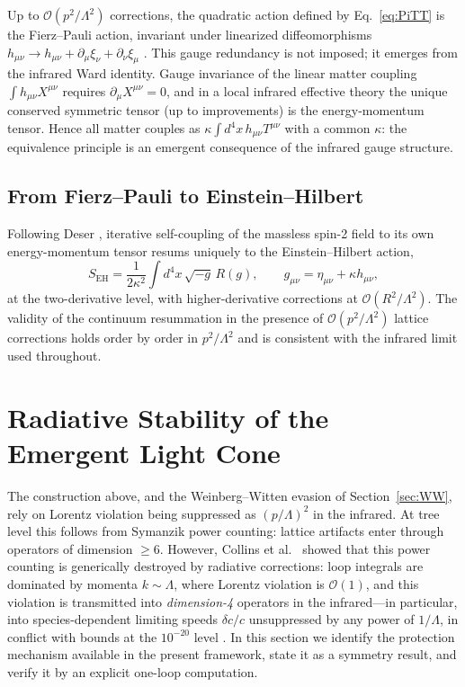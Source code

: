 \documentclass[11pt,a4paper]{article}
\begin{document}
Up to $\mathcal{O}(p^2/\Lambda^2)$ corrections, the quadratic
action defined by Eq.~\eqref{eq:PiTT} is the Fierz--Pauli action,
invariant under linearized diffeomorphisms
$h_{\mu\nu} \to h_{\mu\nu} + \partial_\mu\xi_\nu
+ \partial_\nu\xi_\mu$ \cite{Fierz:1939ix}.
This gauge redundancy is not imposed; it emerges from the infrared
Ward identity.
Gauge invariance of the linear matter coupling
$\int h_{\mu\nu}X^{\mu\nu}$ requires
$\partial_\mu X^{\mu\nu} = 0$, and in a local infrared effective
theory the unique conserved symmetric tensor (up to improvements)
is the energy-momentum tensor.
Hence all matter couples as
$\kappa\int d^4x\,h_{\mu\nu}T^{\mu\nu}$ with a common $\kappa$:
the equivalence principle is an emergent consequence of the
infrared gauge structure.

\subsection{From Fierz--Pauli to Einstein--Hilbert}

Following Deser \cite{Deser:1969wk}, iterative self-coupling of the
massless spin-2 field to its own energy-momentum tensor resums
uniquely to the Einstein--Hilbert action,
\begin{equation}
S_{\mathrm{EH}} = \frac{1}{2\kappa^2}\int d^4x\,
\sqrt{-g}\,R(g),
\qquad
g_{\mu\nu} = \eta_{\mu\nu} + \kappa h_{\mu\nu},
\label{eq:EH}
\end{equation}
at the two-derivative level, with higher-derivative corrections at
$\mathcal{O}(R^2/\Lambda^2)$.
The validity of the continuum resummation in the presence of
$\mathcal{O}(p^2/\Lambda^2)$ lattice corrections holds order by
order in $p^2/\Lambda^2$ and is consistent with the infrared limit
used throughout.


\section{Radiative Stability of the Emergent Light Cone}
\label{sec:lightcone}

The construction above, and the Weinberg--Witten evasion of
Section~\ref{sec:WW}, rely on Lorentz violation being suppressed as
$(p/\Lambda)^2$ in the infrared.
At tree level this follows from Symanzik power counting: lattice
artifacts enter through operators of dimension $\geq 6$.
However, Collins et al.\ \cite{Collins:2004bp} showed that this
power counting is generically destroyed by radiative corrections:
loop integrals are dominated by momenta $k \sim \Lambda$, where
Lorentz violation is $\mathcal{O}(1)$, and this violation is
transmitted into \emph{dimension-4} operators in the
infrared---in particular, into species-dependent limiting speeds
$\delta c/c$ unsuppressed by any power of $1/\Lambda$, in conflict
with bounds at the $10^{-20}$ level \cite{Liberati:2013xla}.
In this section we identify the protection mechanism available in
the present framework, state it as a symmetry result, and verify it
by an explicit one-loop computation.
\end{document}
